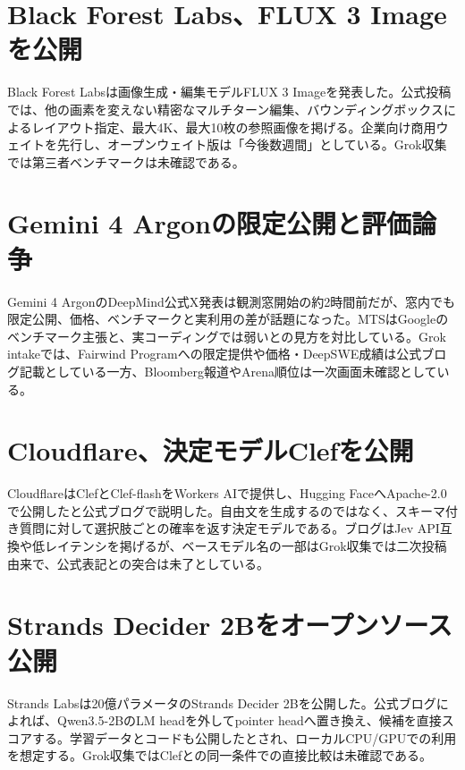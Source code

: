 \section{Black Forest Labs、FLUX 3 Imageを公開}
Black Forest Labsは画像生成・編集モデルFLUX 3 Imageを発表した。公式投稿では、他の画素を変えない精密なマルチターン編集、バウンディングボックスによるレイアウト指定、最大4K、最大10枚の参照画像を掲げる。企業向け商用ウェイトを先行し、オープンウェイト版は「今後数週間」としている。Grok収集では第三者ベンチマークは未確認である。

\section{Gemini 4 Argonの限定公開と評価論争}
Gemini 4 ArgonのDeepMind公式X発表は観測窓開始の約2時間前だが、窓内でも限定公開、価格、ベンチマークと実利用の差が話題になった。MTSはGoogleのベンチマーク主張と、実コーディングでは弱いとの見方を対比している。Grok intakeでは、Fairwind Programへの限定提供や価格・DeepSWE成績は公式ブログ記載としている一方、Bloomberg報道やArena順位は一次画面未確認としている。

\section{Cloudflare、決定モデルClefを公開}
CloudflareはClefとClef-flashをWorkers AIで提供し、Hugging FaceへApache-2.0で公開したと公式ブログで説明した。自由文を生成するのではなく、スキーマ付き質問に対して選択肢ごとの確率を返す決定モデルである。ブログはJev API互換や低レイテンシを掲げるが、ベースモデル名の一部はGrok収集では二次投稿由来で、公式表記との突合は未了としている。

\section{Strands Decider 2Bをオープンソース公開}
Strands Labsは20億パラメータのStrands Decider 2Bを公開した。公式ブログによれば、Qwen3.5-2BのLM headを外してpointer headへ置き換え、候補を直接スコアする。学習データとコードも公開したとされ、ローカルCPU/GPUでの利用を想定する。Grok収集ではClefとの同一条件での直接比較は未確認である。

